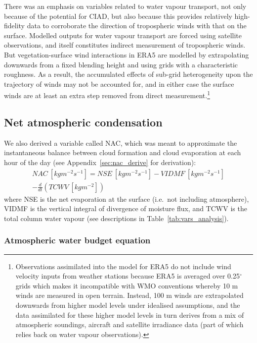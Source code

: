There was an emphasis on variables related to water vapour transport, not only because of the potential for \ac{CIAD}, but also because this provides relatively high-fidelity data to corroborate the direction of tropospheric winds with that on the surface. Modelled outputs for water vapour transport are forced using satellite observations, and itself constitutes indirect measurement of tropospheric winds. But vegetation-surface wind interactions in ERA5 are modelled by extrapolating downwards from a fixed blending height and using grids with a characteristic roughness. As a result, the accumulated effects of sub-grid heterogeneity upon the trajectory of winds may not be accounted for, and in either case the surface winds are at least an extra step removed from direct measurement.\footnote{Observations assimilated into the model for \ac{ERA5} do not include wind velocity inputs from weather stations because \ac{ERA5} is averaged over 0.25$^\circ$ grids which makes it incompatible with \ac{WMO} conventions whereby 10 m winds are measured in open terrain. Instead, 100 m winds are extrapolated downwards from higher model levels under idealised assumptions, and the data assimilated for these higher model levels in turn derives from a mix of atmospheric soundings, aircraft and satellite irradiance data (part of which relies back on water vapour observations).}

\subsection{Net atmospheric condensation}

We also derived a variable called \ac{NAC}, which was meant to approximate the instantaneous balance between cloud formation and cloud evaporation at each hour of the day (see Appendix~\ref{sec:nac_derive} for derivation):
\begin{eqnarray}
	\label{eq:nac}
	NAC \ [kg m^{-2} s^{-1}] = NSE \ [kg m^{-2} s^{-1}] - VIDMF \ [kg m^{-2} s^{-1}] \\ 
	- \frac{d}{dt}(TCWV \ [kg m^{-2}]) \nonumber
\end{eqnarray}
where \acs{NSE} is the net evaporation at the surface (i.e.\ not including atmosphere), \acs{VIDMF} is the vertical integral of divergence of moisture flux, and \acs{TCWV} is the total column water vapour (see descriptions in Table~\ref{tab:vars_analysis}).

\subsubsection{Atmospheric water budget equation}

